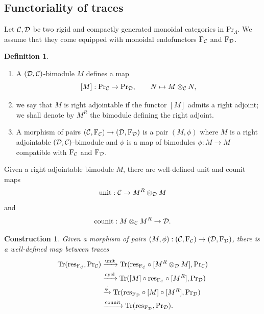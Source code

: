 \documentclass[a4paper, 10pt, oneside, reqno]{amsart}
\theoremstyle{plain}
\newtheorem{construction}[thm]{Construction}
\theoremstyle{definition}
\newtheorem{defi}[thm]{Definition}
\theoremstyle{remark}
\newcommand{\Prr}{\mathrm{Pr}}
\newcommand{\restr}{\mathrm{res}}
\newcommand{\Dcal}{\mathcal{D}}
\newcommand{\unit}{\mathrm{unit}}
\newcommand{\counit}{\mathrm{counit}}
\newcommand{\cycl}{\mathrm{cycl}}
\begin{document}
\subsection{Functoriality of traces}\label{sec:funtoriality-of-traces}

Let $\Ccal, \Dcal$ be two rigid and compactly generated monoidal categories in $\Prr_{\Lambda}$. We assume that they come equipped with monoidal endofunctors $\mathrm{F}_{\mathcal{C}}$ and $\Frob_{\Dcal}$. 

\begin{defi}\label{defi:functoriality-of-traces}
\begin{enumerate}
\item A $(\Dcal, \Ccal)$-bimodule $M$ defines a map 
$$[M] : \Prr_{\Ccal} \to \Prr_{\Dcal}, \qquad N \mapsto M \otimes_{\Ccal} N,$$
\item we say that $M$ is right adjointable if the functor $[M]$ admits a right adjoint; we shall denote by $M^R$ the bimodule defining the right adjoint. 
\item A morphism of pairs $(\Ccal, \Frob_{\Ccal}) \to (\Dcal, \Frob_{\Dcal})$ is a pair $(M, \phi)$ where $M$ is a right adjointable $(\Dcal, \Ccal)$-bimodule and $\phi$ is a map of bimodules $\phi : M \to M$ compatible with $\mathrm{F}_{\mathcal{C}}$ and $\Frob_{\Dcal}$. 
\end{enumerate}
\end{defi}

Given a right adjointable bimodule $M$, there are well-defined unit and counit maps 
$$\unit : \Ccal \to M^R \otimes_{\Dcal} M$$
and 
$$\counit : M \otimes_{\Ccal} M^R \to \Dcal.$$

\begin{construction}
Given a morphism of pairs $(M,\phi) : (\Ccal, \Frob_{\Ccal}) \to (\Dcal, \Frob_{\Dcal})$, there is a well-defined map between traces 
\begin{align*}
\Tr(\restr_{\Frob_{\Ccal}}, \Prr_{\Ccal}) &\xrightarrow{\unit} \Tr(\restr_{\Frob_{\Ccal}} \circ [M^R \otimes_{\Dcal} M], \Prr_{\Ccal}) \\
&\xrightarrow{\cycl} \Tr([M] \circ \restr_{\Frob_{\Ccal}} \circ [M^R], \Prr_{\Dcal}) \\
&\xrightarrow{\phi} \Tr(\restr_{\Frob_{\Dcal}} \circ [M] \circ [M^R], \Prr_{\Dcal}) \\
&\xrightarrow{\counit} \Tr(\restr_{\Frob_{\Dcal}} , \Prr_{\Dcal}).
\end{align*}
\end{construction}
\end{document}
